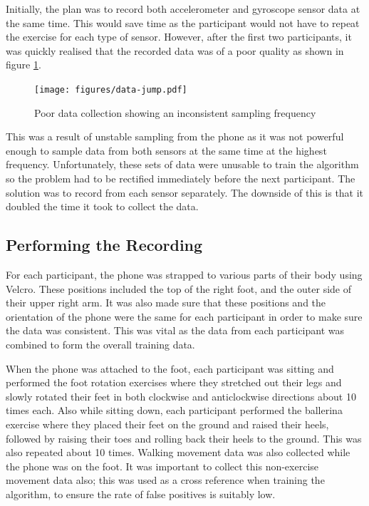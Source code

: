 Initially, the plan was to record both accelerometer and gyroscope sensor data at the same time. This would save time as the participant would not have to repeat the exercise for each type of sensor. However, after the first two participants, it was quickly realised that the recorded data was of a poor quality as shown in figure \ref{fig:bad-data}.

\begin{figure}
	\centering
	\texttt{[image: figures/data-jump.pdf]}
	\caption{Poor data collection showing an inconsistent sampling frequency\label{fig:bad-data}}
\end{figure}

This was a result of unstable sampling from the phone as it was not powerful enough to sample data from both sensors at the same time at the highest frequency. Unfortunately, these sets of data were unusable to train the algorithm so the problem had to be rectified immediately before the next participant. The solution was to record from each sensor separately. The downside of this is that it doubled the time it took to collect the data.

\subsection{Performing the Recording}
For each participant, the phone was strapped to various parts of their body using Velcro. These positions included the top of the right foot, and the outer side of their upper right arm. It was also made sure that these positions and the orientation of the phone were the same for each participant in order to make sure the data was consistent. This was vital as the data from each participant was combined to form the overall training data.

When the phone was attached to the foot, each participant was sitting and performed the foot rotation exercises where they stretched out their legs and slowly rotated their feet in both clockwise and anticlockwise directions about 10 times each. Also while sitting down, each participant performed the ballerina exercise where they placed their feet on the ground and raised their heels, followed by raising their toes and rolling back their heels to the ground. This was also repeated about 10 times. Walking movement data was also collected while the phone was on the foot. It was important to collect this non-exercise movement data also; this was used as a cross reference when training the algorithm, to ensure the rate of false positives is suitably low.

